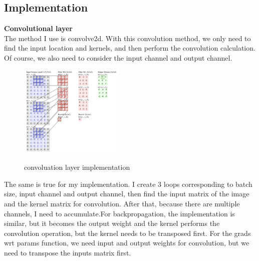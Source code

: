 \documentclass{article}
\begin{document}
\subsection{Implementation}

\textbf{Convolutional layer}\\
The method I use is convolve2d. With this convolution method, we only need to find the input location and kernels, and then perform the convolution calculation. Of course, we also need to consider the input channel and output channel.
\begin{figure}[H] %
	\centering %
	\includegraphics[width=0.45\textwidth]{./pic/part1/cnlayerImp.png} %
	\caption{convoluation layer implementation} %
	\label{Fig.main2} %
	\cite{cs231n}
\end{figure}
The same is true for my implementation. I create 3 loops corresponding to batch  size, input channel and output channel, then find the input matrix of the image and the kernel matrix for convolution. After that, because there are multiple channels, I need to accumulate.For backpropagation, the implementation is similar, but it becomes the output weight and the kernel performs the convolution operation, but the kernel needs to be transposed first. For the grads wrt params function, we need input and output weights for convolution, but we need to transpose the inputs matrix first.\\
\end{document}
